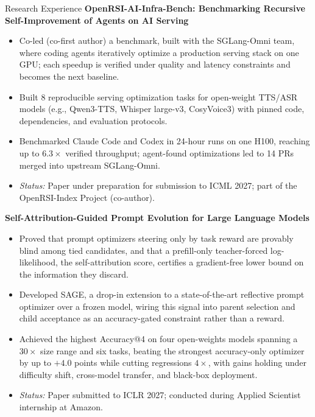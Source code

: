 \documentclass[a4paper, 12pt]{resume} %
\begin{document}
\begin{rSection}{Research Experience}
{\bf OpenRSI-AI-Infra-Bench: Benchmarking Recursive Self-Improvement of Agents on AI Serving}
\begin{itemize}[noitemsep, topsep=0pt, leftmargin=*]
\item Co-led (co-first author) a benchmark, built with the SGLang-Omni team, where coding agents iteratively optimize a production serving stack on one GPU; each speedup is verified under quality and latency constraints and becomes the next baseline.
\item Built 8 reproducible serving optimization tasks for open-weight TTS/ASR models (e.g., Qwen3-TTS, Whisper large-v3, CosyVoice3) with pinned code, dependencies, and evaluation protocols.
\item Benchmarked Claude Code and Codex in 24-hour runs on one H100, reaching up to $6.3\times$ verified throughput; agent-found optimizations led to 14 PRs merged into upstream SGLang-Omni.
\item \emph{Status:} Paper under preparation for submission to ICML 2027; part of the OpenRSI-Index Project (co-author).
\end{itemize}

{\bf Self-Attribution-Guided Prompt Evolution for  Large Language Models}
\begin{itemize}[noitemsep, topsep=0pt, leftmargin=*]
\item Proved that prompt optimizers steering only by task reward are provably blind among tied candidates, and that a prefill-only teacher-forced log-likelihood, the self-attribution score, certifies a gradient-free lower bound on the information they discard.
\item Developed SAGE, a drop-in extension to a state-of-the-art reflective prompt optimizer over a frozen model, wiring this signal into parent selection and child acceptance as an accuracy-gated constraint rather than a reward.
\item Achieved the highest Accuracy@4 on four open-weights models spanning a $30\times$ size range and six tasks, beating the strongest accuracy-only optimizer by up to $+4.0$ points while cutting regressions $4\times$, with gains holding under difficulty shift, cross-model transfer, and black-box deployment.
\item \emph{Status:} Paper submitted to ICLR 2027; conducted during Applied Scientist internship at Amazon.
\end{itemize}



\end{rSection}
\end{document}
